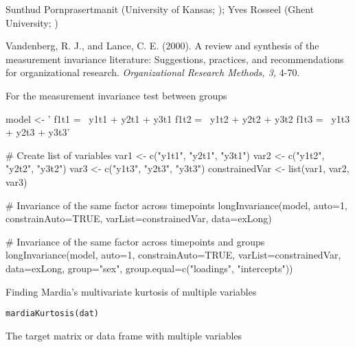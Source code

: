 \documentclass[a4paper]{book}
\begin{document}
%
\begin{Author}\relax
Sunthud Pornprasertmanit (University of Kansas; ); Yves Rosseel (Ghent University; )
\end{Author}
%
\begin{References}\relax
Vandenberg, R. J., and Lance, C. E. (2000). A review and synthesis of the measurement invariance literature: Suggestions, practices, and recommendations for organizational research. \emph{Organizational Research Methods, 3,} 4-70.
\end{References}
%
\begin{SeeAlso}\relax
{} For the measurement invariance test between groups
\end{SeeAlso}
%
\begin{Examples}
\begin{ExampleCode}
model <- ' f1t1 =~ y1t1 + y2t1 + y3t1
              f1t2 =~ y1t2 + y2t2 + y3t2
			  f1t3 =~ y1t3 + y2t3 + y3t3'

# Create list of variables
var1 <- c("y1t1", "y2t1", "y3t1")
var2 <- c("y1t2", "y2t2", "y3t2")
var3 <- c("y1t3", "y2t3", "y3t3")
constrainedVar <- list(var1, var2, var3)

# Invariance of the same factor across timepoints
longInvariance(model, auto=1, constrainAuto=TRUE, varList=constrainedVar, data=exLong)

# Invariance of the same factor across timepoints and groups
longInvariance(model, auto=1, constrainAuto=TRUE, varList=constrainedVar, data=exLong, group="sex", 
	group.equal=c("loadings", "intercepts"))
\end{ExampleCode}
\end{Examples}
%
\begin{Description}\relax
Finding Mardia's multivariate kurtosis of multiple variables
\end{Description}
%
\begin{Usage}
\begin{verbatim}
mardiaKurtosis(dat)
\end{verbatim}
\end{Usage}
%
\begin{Arguments}
\begin{ldescription}
\item[\code{dat}] 
The target matrix or data frame with multiple variables

\end{ldescription}
\end{Arguments}
\end{document}
